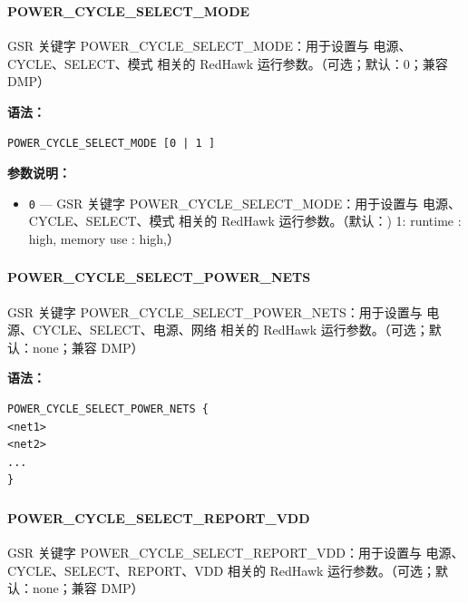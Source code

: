 \subsubsection{}
\paragraph*{POWER_CYCLE_SELECT_MODE}

GSR 关键字 POWER_CYCLE_SELECT_MODE：用于设置与 电源、CYCLE、SELECT、模式 相关的 RedHawk 运行参数。（可选；默认：0；兼容 DMP）

\textbf{语法：}
\begin{lstlisting}
POWER_CYCLE_SELECT_MODE [0 | 1 ]
\end{lstlisting}

\textbf{参数说明：}
\begin{itemize}
\item \texttt{0} — GSR 关键字 POWER\_CYCLE\_SELECT\_MODE：用于设置与 电源、CYCLE、SELECT、模式 相关的 RedHawk 运行参数。（默认：) 1: runtime : high, memory use : high,）
\end{itemize}

\subsubsection{}
\paragraph*{POWER_CYCLE_SELECT_POWER_NETS}

GSR 关键字 POWER_CYCLE_SELECT_POWER_NETS：用于设置与 电源、CYCLE、SELECT、电源、网络 相关的 RedHawk 运行参数。（可选；默认：none；兼容 DMP）

\textbf{语法：}
\begin{lstlisting}
POWER_CYCLE_SELECT_POWER_NETS {
<net1>
<net2>
...
}
\end{lstlisting}

\subsubsection{}
\paragraph*{POWER_CYCLE_SELECT_REPORT_VDD}

GSR 关键字 POWER_CYCLE_SELECT_REPORT_VDD：用于设置与 电源、CYCLE、SELECT、REPORT、VDD 相关的 RedHawk 运行参数。（可选；默认：none；兼容 DMP）

